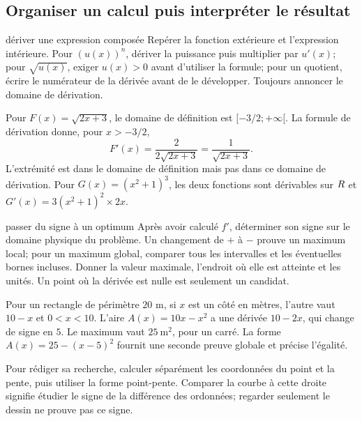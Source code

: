 \subsection*{Organiser un calcul puis interpréter le résultat}
\begin{methode}{dériver une expression composée}
Repérer la fonction extérieure et l’expression intérieure. Pour $(u(x))^n$, dériver la puissance puis multiplier par $u'(x)$; pour $\sqrt{u(x)}$, exiger $u(x)>0$ avant d’utiliser la formule; pour un quotient, écrire le numérateur de la dérivée avant de le développer. Toujours annoncer le domaine de dérivation.
\end{methode}
\begin{exemple}
Pour $F(x)=\sqrt{2x+3}$, le domaine de définition est $[-3/2;+\infty[$. La formule de dérivation donne, pour $x>-3/2$,
\[
F'(x)=\frac{2}{2\sqrt{2x+3}}=\frac1{\sqrt{2x+3}}.
\]
L’extrémité est dans le domaine de définition mais pas dans ce domaine de dérivation. Pour $G(x)=(x^2+1)^3$, les deux fonctions sont dérivables sur $R$ et $G'(x)=3(x^2+1)^2\times2x$.
\end{exemple}
\begin{methode}{passer du signe à un optimum}
Après avoir calculé $f'$, déterminer son signe sur le domaine physique du problème. Un changement de $+$ à $-$ prouve un maximum local; pour un maximum global, comparer tous les intervalles et les éventuelles bornes incluses. Donner la valeur maximale, l’endroit où elle est atteinte et les unités. Un point où la dérivée est nulle est seulement un candidat.
\end{methode}
\begin{exemple}
Pour un rectangle de périmètre $20$ m, si $x$ est un côté en mètres, l’autre vaut $10-x$ et $0<x<10$. L’aire $A(x)=10x-x^2$ a une dérivée $10-2x$, qui change de signe en $5$. Le maximum vaut $25\ \mathrm{m}^2$, pour un carré. La forme $A(x)=25-(x-5)^2$ fournit une seconde preuve globale et précise l’égalité.
\end{exemple}
\begin{remarque}
Pour rédiger sa recherche, calculer séparément les coordonnées du point et la pente, puis utiliser la forme point-pente. Comparer la courbe à cette droite signifie étudier le signe de la différence des ordonnées; regarder seulement le dessin ne prouve pas ce signe.
\end{remarque}

